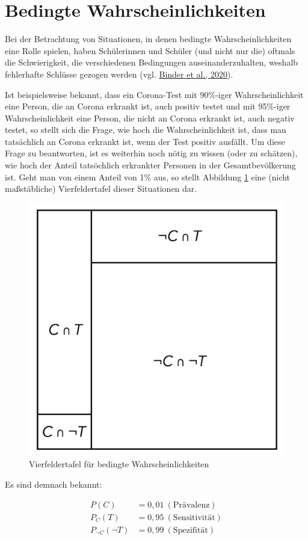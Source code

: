 \documentclass[
]{scrbook}
\theoremstyle{definition}
\theoremstyle{definition}
\theoremstyle{definition}
\theoremstyle{definition}
\theoremstyle{remark}
\begin{document}
\hypertarget{bedingte-wahrscheinlichkeiten}{%
\section{Bedingte Wahrscheinlichkeiten}\label{bedingte-wahrscheinlichkeiten}}

Bei der Betrachtung von Situationen, in denen bedingte Wahrscheinlichkeiten eine Rolle spielen, haben Schülerinnen und Schüler (und nicht nur die) oftmals die Schwierigkeit, die verschiedenen Bedingungen auseinanderzuhalten, weshalb fehlerhafte Schlüsse gezogen werden (vgl. \protect\hyperlink{ref-Binder2020}{Binder et al., 2020}).

Ist beispielsweise bekannt, dass ein Corona-Test mit 90\%-iger Wahrscheinlichkeit eine Person, die an Corona erkrankt ist, auch positiv testet und mit 95\%-iger Wahrscheinlichkeit eine Person, die nicht an Corona erkrankt ist, auch negativ testet, so stellt sich die Frage, wie hoch die Wahrscheinlichkeit ist, dass man tatsächlich an Corona erkrankt ist, wenn der Test positiv ausfällt. Um diese Frage zu beantworten, ist es weiterhin noch nötig zu wissen (oder zu schätzen), wie hoch der Anteil tatsöchlich erkrankter Personen in der Gesamtbevölkerung ist. Geht man von einem Anteil von 1\% aus, so stellt Abbildung \ref{fig:Vierfeld} eine (nicht maßstäbliche) Vierfeldertafel dieser Situationen dar.

\begin{figure}

{\centering \includegraphics[width=0.5\linewidth]{pictures/14-Vierfeld} 

}

\caption{Vierfeldertafel für bedingte Wahrscheinlichkeiten}\label{fig:Vierfeld}
\end{figure}

Es sind demnach bekannt:

\begin{align}
P(C) &= 0,\!01 \ \mathrm{(Prävalenz)}\\
P_C(T) &= 0,\!95 \ \mathrm{(Sensitivität)}\\
P_{\neg C}(\neg T) &= 0,\!99 \ \mathrm{(Spezifität)}
\end{align}
\end{document}
